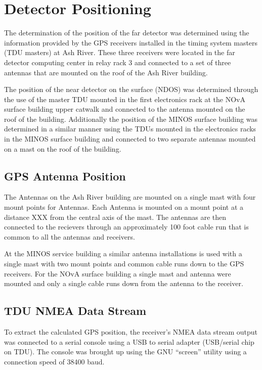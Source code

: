 \section{Detector Positioning}

The determination of the position of the far detector was determined
using the information provided by the GPS receivers installed in the
timing system masters (TDU masters) at Ash River.  These three receivers
were located in the far detector computing center in relay rack 3 and
connected to a set of three antennas that are mounted on the roof of
the Ash River building.

The position of the near detector on the surface (NDOS) was determined
through the use of the master TDU mounted in the first electronics
rack at the NOvA surface building upper catwalk and connected to the
antenna mounted on the roof of the building.  Additionally the
position of the MINOS surface building was determined in a similar
manner using the TDUs mounted in the electronics racks in the MINOS
surface building and connected to two separate antennas mounted on a
mast on the roof of the building.

\subsection{GPS Antenna Position}

The Antennas on the Ash River building are mounted on a single mast
with four mount points for Antennas.  Each Antenna is mounted on a
mount point at a distance XXX from the central axis of the mast.  The
antennas are then connected to the recievers through an approximately
100 foot cable run that is common to all the antennas and receivers.

At the MINOS service building a similar antenna installations is used
with a single mast with two mount points and common cable runs down to
the GPS receivers.  For the NOvA surface building a single mast and
antenna were mounted and only a single cable runs down from the
antenna to the receiver.

\subsection{TDU NMEA Data Stream}

To extract the calculated GPS position, the receiver's NMEA data
stream output was connected to a serial console using a USB to serial
adapter (USB/serial chip on TDU).  The console was brought up using
the GNU ``screen'' utility using a connection speed of 38400 baud.

